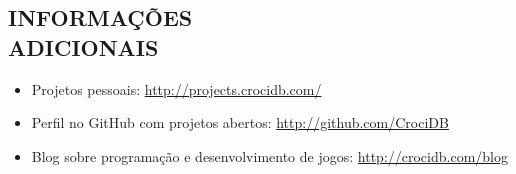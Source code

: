 \documentclass[line,margin]{res}
\begin{document}
\begin{resume}
\section{INFORMAÇÕES \\ ADICIONAIS}
            \begin{itemize}  \itemsep -3pt
            \item Projetos pessoais: \href{http://projects.crocidb.com/}{http://projects.crocidb.com/}
            \item Perfil no GitHub com projetos abertos: \href{http://github.com/CrociDB}{http://github.com/CrociDB}
            \item Blog sobre programação e desenvolvimento de jogos: \href{http://crocidb.com/blog}{http://crocidb.com/blog}
            \end{itemize} 
          

\end{resume}
\end{document}
